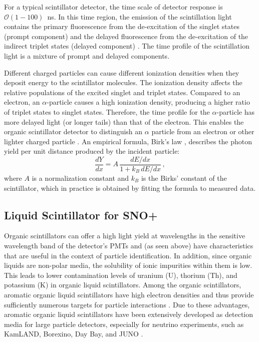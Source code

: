 For a typical scintillator detector, the time scale of detector response is $\mathcal{O}(1-100)$~ns. In this time region, the emission of the scintillation light contains the primary fluorescence from the de-excitation of the singlet states (prompt component) and the delayed fluorescence from the de-excitation of the indirect triplet states (delayed component) \cite{dunger2018topological}. The time profile of the scintillation light is a mixture of prompt and delayed components. 

Different charged particles can cause different ionization densities when they deposit energy to the scintillator molecules. The ionization density affects the relative populations of the excited singlet and triplet states. Compared to an electron, an $\alpha$-particle causes a high ionization density, producing a higher ratio of triplet states to singlet states. Therefore, the time profile for the $\alpha$-particle has more delayed light (or longer tails) than that of the electron. This enables the organic scintillator detector to distinguish an $\alpha$ particle from an electron or other lighter charged particle \cite{dunger2018topological, collaboration2020development}.
An empirical formula, Birk's law \cite{birks1951scintillations, birks1965theory}, describes the photon yield per unit distance produced by the incident particle:
\begin{equation}
\frac{dY}{dx}=A \, \frac{dE/dx}{1+k_B \, dE/dx} \, ,
\end{equation}
where $A$ is a normalization constant and $k_B$ is the Birks' constant of the scintillator, which in practice is obtained by fitting the formula to measured data.

\subsection{Liquid Scintillator for SNO+}\label{sect:LSproperty}

Organic scintillators can offer a high light yield at wavelengths in the sensitive wavelength band of the detector's PMTs and (as seen above) have characteristics that are useful in the context of particle identification. In addition, since organic liquids are non-polar media, the solubility of ionic impurities within them is low. This leads to lower contamination levels of uranium (U), thorium (Th), and potassium (K) in organic liquid scintillators. Among the organic scintillators, aromatic organic liquid scintillators have high electron densities and thus provide sufficiently numerous targets for particle interactions \cite{PerkinElmer}. Due to these advantages, aromatic organic liquid scintillators have been extensively developed as detection media for large particle detectors, especially for neutrino experiments, such as KamLAND, Borexino, Day Bay, and JUNO \cite{collaboration2020development}.

